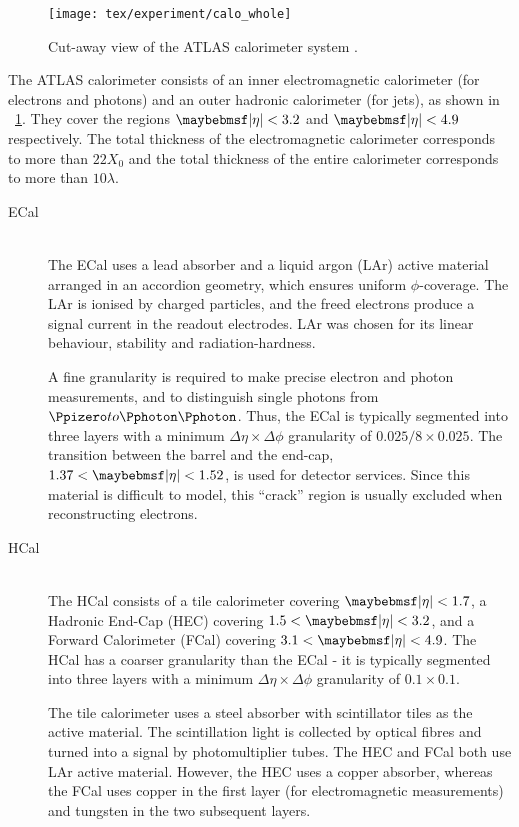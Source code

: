 \begin{figure}
	\texttt{[image: tex/experiment/calo\_whole]}
	\caption{Cut-away view of the ATLAS calorimeter system \cite{ATLAS-detector}.}
	\label{fig:calorimeters}
\end{figure}

The ATLAS calorimeter consists of an inner electromagnetic calorimeter (for electrons and 
photons) and an outer hadronic calorimeter (for jets), as shown in 
\Figure~\ref{fig:calorimeters}. They cover the regions $\mods{\eta} < 3.2$ and 
$\mods{\eta} < 4.9$ respectively. The total thickness of the electromagnetic calorimeter 
corresponds to more than $22 X_0$ and the total thickness of the entire calorimeter 
corresponds to more than $10 \lambda$.
\begin{description}
\item[\ac{ECal}] \hfill \\
	The \ac{ECal} uses a lead absorber and a liquid argon (LAr) active material arranged 
	in an accordion geometry, which ensures uniform $\phi$-coverage. The LAr is ionised 
	by charged particles, and the freed electrons produce a signal current in the readout 
	electrodes. LAr was chosen for its linear behaviour, stability and radiation-hardness.

	A fine granularity is required to make precise electron and photon measurements, and 
	to distinguish single photons from $\HepProcess{\Ppizero \HepTo \Pphoton \Pphoton}$. 
	Thus, the \ac{ECal} is typically segmented into three layers with a minimum 
	$\Delta\eta\times\Delta\phi$ granularity of $0.025/8 \times 0.025$. The transition 
	between the barrel and the end-cap, $1.37 < \mods{\eta} < 1.52$, is used for detector 
	services. Since this material is difficult to model, this ``crack'' region is usually 
	excluded when reconstructing electrons.
\item[\ac{HCal}] \hfill \\
	The \ac{HCal} consists of a tile calorimeter covering $\mods{\eta} < 1.7$, a Hadronic 
	End-Cap (HEC) covering $1.5 < \mods{\eta} < 3.2$, and a Forward Calorimeter (FCal) 
	covering $3.1 < \mods{\eta} < 4.9$. The \ac{HCal} has a coarser granularity than the
	\ac{ECal} - it is typically segmented into three layers with a minimum 
	$\Delta\eta\times\Delta\phi$ granularity of $0.1 \times 0.1$.

	The tile calorimeter uses a steel absorber with scintillator tiles as the active 
	material. The scintillation light is collected by optical fibres and turned into a 
	signal by photomultiplier tubes. The HEC and FCal both use LAr active material.
	However, the HEC uses a copper absorber, whereas the FCal uses copper in the first 
	layer (for electromagnetic measurements) and tungsten in the two subsequent layers.
\end{description}



